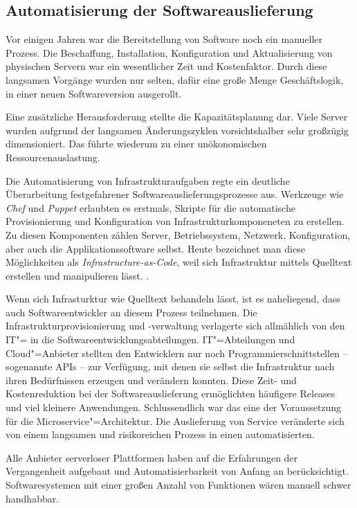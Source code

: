 \subsection{Automatisierung der Softwareauslieferung}

Vor einigen Jahren war die Bereitstellung von Software noch ein manueller Prozess. Die Beschaffung, Installation, Konfiguration und Aktualisierung von physischen Servern war ein wesentlicher Zeit und Kostenfaktor. Durch diese langsamen Vorgänge wurden nur selten, dafür eine große Menge Geschäftslogik, in einer neuen Softwareversion ausgerollt. 

Eine zusätzliche Herausforderung stellte die Kapazitätsplanung dar. Viele Server wurden aufgrund der langsamen Änderungszyklen  vorsichtshalber sehr großzügig dimensioniert. Das führte wiederum zu einer unökonomischen Ressourcenauslastung.

Die Automatisierung von Infrastrukturaufgaben regte ein deutliche Überarbeitung festgefahrener Softwareauslieferungsprozesse aus. Werkzeuge wie \textit{Chef} und \textit{Puppet} erlaubten es erstmals, Skripte für die automatische Provisionierung und Konfiguration von Infrastrukturkomponeneten zu erstellen. Zu diesen Komponenten zählen Server, Betriebssystem, Netzwerk, Konfiguration, aber auch die Applikationssoftware selbst. Heute bezeichnet man diese Möglichkeiten als \textit{Infrastructure-as-Code}, weil sich Infrastruktur mittels Quelltext erstellen und manipulieren lässt. \cite[135]{Httermann:2012:DD:2380958}.

Wenn sich Infrasturktur wie Quelltext behandeln lässt, ist es naheliegend, dass auch Softwareentwickler an diesem Prozess teilnehmen. Die Infrastrukturprovisionierung und -verwaltung verlagerte sich allmählich von den IT"= in die Softwareentwicklungsabteilungen. IT"=Abteilungen und Cloud"=Anbieter stellten den Entwicklern nur noch Programmierschnittstellen -- sogenannte APIs -- zur Verfügung, mit denen sie selbst die Infrastruktur nach ihren Bedürfnissen erzeugen und verändern konnten. Diese Zeit- und Kostenreduktion bei der Softwareauslieferung ermöglichten häufigere Releases und viel kleinere Anwendungen. Schlussendlich war das eine der Voraussetzung für die Microservice"=Architektur. Die Auslieferung von Service veränderte sich von einem langsamen und risikoreichen Prozess in einen automatisierten.

Alle Anbieter serverloser Plattformen haben auf die Erfahrungen der Vergangenheit aufgebaut und Automatisierbarkeit von Anfang an berücksichtigt. Softwaresystemen mit einer großen Anzahl von Funktionen wären manuell schwer handhabbar. 

